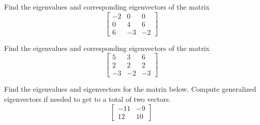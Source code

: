 \begin{exercise}\ansMark%
Find the eigenvalues and corresponding eigenvectors of the matrix 
\[ \begin{bmatrix} -2 & 0 & 0 \\ 0 & 4 & 6 \\ 6 & -3 & -2 \end{bmatrix} \]
\end{exercise}

\begin{exercise}\ansMark%
Find the eigenvalues and corresponding eigenvectors of the matrix 
\[ \begin{bmatrix} 5 & 3 & 6 \\ 2 & 2 & 2 \\ -3 & -2 & -3 \end{bmatrix} \]
\end{exercise}

\begin{exercise}\ansMark%
Find the eigenvalues and eigenvectors for the matrix below. Compute generalized eigenvectors if needed to get to a total of two vectors. 
\[ \begin{bmatrix} -11 & -9 \\ 12 & 10 \end{bmatrix} \]
\end{exercise}

